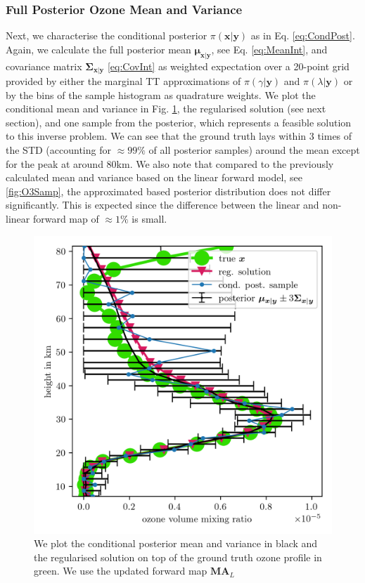 \subsubsection{Full Posterior Ozone Mean and Variance}
Next, we characterise the conditional posterior $\pi(\bm{x}|\bm{y})$ as in Eq. \ref{eq:CondPost}. 
Again, we calculate the full posterior mean $\bm{\mu}_{\bm{x}|\bm{y}}$, see Eq. \ref{eq:MeanInt}, and covariance matrix $\bm{\Sigma}_{ \bm{x}|\bm{y}}$ \ref{eq:CovInt} as weighted expectation over a 20-point grid provided by either the marginal TT approximations of $\pi(\gamma| \bm{y})$ and $\pi(\lambda| \bm{y})$ or by the bins of the sample histogram as quadrature weights.
We plot the conditional mean and variance in Fig. \ref{fig:O3SolplsReg}, the regularised solution (see next section), and one sample from the posterior, which represents a feasible solution to this inverse problem.
We can see that the ground truth lays within 3 times of the STD (accounting for $\approx 99 \%$ of all posterior samples) around the mean except for the peak at around $80$km.
We also note that compared to the previously calculated mean and variance based on the linear forward model, see \ref{fig:O3Samp}, the approximated based posterior distribution does not differ significantly.
This is expected since the difference between the linear and non-linear forward map of $\approx 1 \%$ is small.
\begin{figure}[ht!]
	\centering
	\includegraphics{SecRecResinclRegandSampl.png}
	\caption[Ozone posterior mean and variance and the regularised solution compared to the ground truth.]{We plot the conditional posterior mean and variance in black and the regularised solution on top of the ground truth ozone profile in green. We use the updated forward map $\bm{M}\bm{A}_L$}
	\label{fig:O3SolplsReg}
\end{figure}

